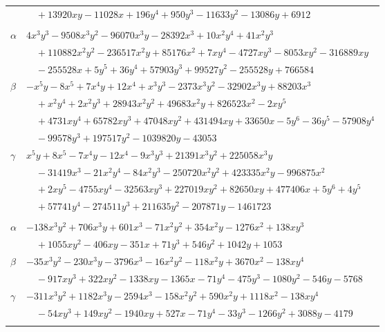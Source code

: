 \documentclass[11pt]{article}
\begin{document}
\begin{longtable}{@{}ll@{}}
 & $\quad +13920xy-11028x+196y^{4}+950y^{3}-11633y^{2}-13086y+6912$\\
\addlinespace[3pt]
\multicolumn{2}{@{}l}{$\{i,j\}=\{21,152\}$, $k_{ij}=2^{3}\cdot 3^{5}\cdot 7\cdot 13^{2}$}\\
$\alpha$ & $4x^{3}y^{3}-9508x^{3}y^{2}-96070x^{3}y-28392x^{3}+10x^{2}y^{4}+41x^{2}y^{3}$\\
 & $\quad +110882x^{2}y^{2}-236517x^{2}y+85176x^{2}+7xy^{4}-4727xy^{3}-8053xy^{2}-316889xy$\\
 & $\quad -255528x+5y^{5}+36y^{4}+57903y^{3}+99527y^{2}-255528y+766584$\\
$\beta$ & $-x^{5}y-8x^{5}+7x^{4}y+12x^{4}+x^{3}y^{3}-2373x^{3}y^{2}-32902x^{3}y+88203x^{3}$\\
 & $\quad +x^{2}y^{4}+2x^{2}y^{3}+28943x^{2}y^{2}+49683x^{2}y+826523x^{2}-2xy^{5}$\\
 & $\quad +4731xy^{4}+65782xy^{3}+47048xy^{2}+431494xy+33650x-5y^{6}-36y^{5}-57908y^{4}$\\
 & $\quad -99578y^{3}+197517y^{2}-1039820y-43053$\\
$\gamma$ & $x^{5}y+8x^{5}-7x^{4}y-12x^{4}-9x^{3}y^{3}+21391x^{3}y^{2}+225058x^{3}y$\\
 & $\quad -31419x^{3}-21x^{2}y^{4}-84x^{2}y^{3}-250720x^{2}y^{2}+423335x^{2}y-996875x^{2}$\\
 & $\quad +2xy^{5}-4755xy^{4}-32563xy^{3}+227019xy^{2}+82650xy+477406x+5y^{6}+4y^{5}$\\
 & $\quad +57741y^{4}-274511y^{3}+211635y^{2}-207871y-1461723$\\
\addlinespace[3pt]
\multicolumn{2}{@{}l}{$\{i,j\}=\{21,153\}$, $k_{ij}=3^{5}\cdot 13$}\\
$\alpha$ & $-138x^{3}y^{2}+706x^{3}y+601x^{3}-71x^{2}y^{2}+354x^{2}y-1276x^{2}+138xy^{3}$\\
 & $\quad +1055xy^{2}-406xy-351x+71y^{3}+546y^{2}+1042y+1053$\\
$\beta$ & $-35x^{3}y^{2}-230x^{3}y-3796x^{3}-16x^{2}y^{2}-118x^{2}y+3670x^{2}-138xy^{4}$\\
 & $\quad -917xy^{3}+322xy^{2}-1338xy-1365x-71y^{4}-475y^{3}-1080y^{2}-546y-5768$\\
$\gamma$ & $-311x^{3}y^{2}+1182x^{3}y-2594x^{3}-158x^{2}y^{2}+590x^{2}y+1118x^{2}-138xy^{4}$\\
 & $\quad -54xy^{3}+149xy^{2}-1940xy+527x-71y^{4}-33y^{3}-1266y^{2}+3088y-4179$\\
\addlinespace[3pt]
\multicolumn{2}{@{}l}{$\{i,j\}=\{21,154\}$, $k_{ij}=2\cdot 3^{5}\cdot 13$}\\

\end{longtable}
\end{document}
